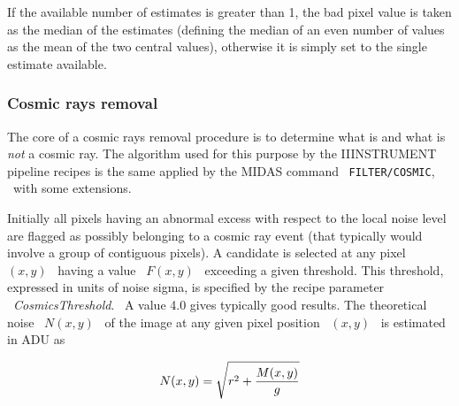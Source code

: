 If the available number of estimates is greater than 1, the
bad pixel value is taken as the median of the estimates (defining
the median of an even number of values as the mean of the two
central values), otherwise it is simply set to the single estimate 
available.

\subsubsection{Cosmic rays removal}
\label{sec:ACOSMIC}

The core of a cosmic rays removal procedure is to determine what is
and what is {\it not} a cosmic ray. The algorithm used for this
purpose by the IIINSTRUMENT pipeline recipes is the same applied by the MIDAS 
command \ {\tt FILTER/COSMIC}, \ with some extensions.

Initially all pixels having an abnormal excess with respect
to the local noise level are flagged as possibly belonging to a
cosmic ray event (that typically would involve a group of contiguous 
pixels).  A candidate is selected at any pixel \ $(x,y)$ \ having a value 
\ $F(x,y)$ \ exceeding a given threshold. This threshold, expressed in
units of noise sigma, is specified by the recipe parameter 
\ {\it CosmicsThreshold}. \ A value 4.0 gives typically good results.
The theoretical
noise \ $N(x,y)$ \ of the image at any given pixel position \ $(x,y)$ \ is 
estimated in ADU as 

$$
          N(x,y) = \sqrt{r^2 + {M(x,y) \over g}}
$$


